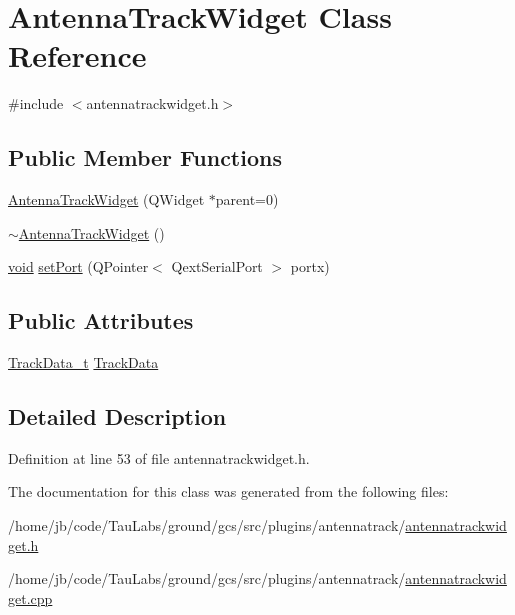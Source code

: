 \hypertarget{class_antenna_track_widget}{\section{\-Antenna\-Track\-Widget \-Class \-Reference}
\label{class_antenna_track_widget}
}


{\ttfamily \#include $<$antennatrackwidget.\-h$>$}

\subsection*{\-Public \-Member \-Functions}
\begin{DoxyCompactItemize}
\item 
\hyperlink{group___antenna_track_gadget_plugin_ga267d3ecf78fda6b906d043097dd0aa45}{\-Antenna\-Track\-Widget} (\-Q\-Widget $\ast$parent=0)
\item 
\hyperlink{group___antenna_track_gadget_plugin_gaee8823dccf11047cf563237c1f8e4864}{$\sim$\-Antenna\-Track\-Widget} ()
\item 
\hyperlink{group___u_a_v_objects_plugin_ga444cf2ff3f0ecbe028adce838d373f5c}{void} \hyperlink{group___antenna_track_gadget_plugin_gafe776706c20e81410397bf737b254c56}{set\-Port} (\-Q\-Pointer$<$ \-Qext\-Serial\-Port $>$ portx)
\end{DoxyCompactItemize}
\subsection*{\-Public \-Attributes}
\begin{DoxyCompactItemize}
\item 
\hyperlink{group___antenna_track_gadget_plugin_ga2a189738d52fd5df21e4a823d19ad1ac}{\-Track\-Data\-\_\-t} \hyperlink{group___antenna_track_gadget_plugin_ga18b3b7f2868671ca1d6e117f0bbccd90}{\-Track\-Data}
\end{DoxyCompactItemize}


\subsection{\-Detailed \-Description}


\-Definition at line 53 of file antennatrackwidget.\-h.



\-The documentation for this class was generated from the following files\-:\begin{DoxyCompactItemize}
\item 
/home/jb/code/\-Tau\-Labs/ground/gcs/src/plugins/antennatrack/\hyperlink{antennatrackwidget_8h}{antennatrackwidget.\-h}\item 
/home/jb/code/\-Tau\-Labs/ground/gcs/src/plugins/antennatrack/\hyperlink{antennatrackwidget_8cpp}{antennatrackwidget.\-cpp}\end{DoxyCompactItemize}
